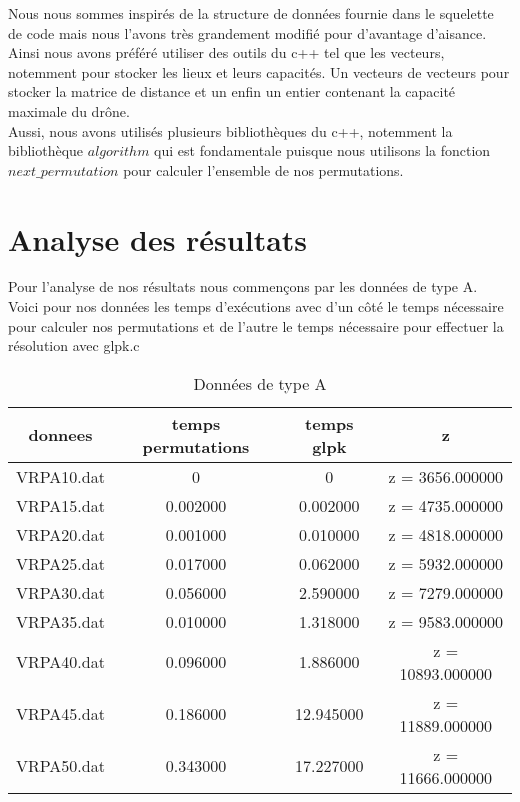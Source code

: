 \documentclass[a4paper,sffamily,12pt]{article}
\begin{document}
			\vspace{0.5cm}

				Nous nous sommes inspirés de la structure de données fournie dans le squelette de code mais nous l'avons très grandement modifié pour d'avantage d'aisance. Ainsi  nous avons préféré utiliser des outils du c++ tel que les vecteurs, notemment pour stocker les lieux et leurs capacités. Un vecteurs de vecteurs pour stocker la matrice de distance et un enfin un entier contenant la capacité maximale du drône. \\
				\indent Aussi, nous avons utilisés plusieurs bibliothèques du c++, notemment la bibliothèque $algorithm$ qui est fondamentale puisque nous utilisons la fonction $next\_permutation$ pour calculer l'ensemble de nos permutations.
		
		
	\section{Analyse des résultats}
	
		\vspace{0.5cm}		

		Pour l'analyse de nos résultats nous commençons par les données de type A. Voici pour nos données les temps d'exécutions avec d'un côté le temps nécessaire pour calculer nos permutations et de l'autre le temps nécessaire pour effectuer la résolution avec glpk.c\\


		\begin{table}[!h]
		
			\centering
		
			\begin{tabular}{ | c | c | c | c |}
			    	
			    	\hline
			  	donnees  & temps permutations & temps glpk  &  z   \\
			   	\hline
				VRPA10.dat	&	0			&	0		&		z = 3656.000000  \\
			 	\hline
				VRPA15.dat	&	0.002000		&	0.002000	&    		z = 4735.000000\\
			    	\hline
				VRPA20.dat	&	0.001000		&	0.010000	&		z = 4818.000000\\
			    	\hline
				VRPA25.dat	&	0.017000		&	0.062000	&		z = 5932.000000\\
			    	\hline
				VRPA30.dat	&	0.056000		&	2.590000	&		z = 7279.000000  \\
				\hline
				VRPA35.dat	&	0.010000		&	1.318000	&		z = 9583.000000 \\
			   	\hline
				VRPA40.dat	&	0.096000		&	1.886000	&		z = 10893.000000 \\
			   	\hline
			 	VRPA45.dat	&	0.186000		&	12.945000	&		z = 11889.000000  \\
				\hline
				VRPA50.dat	&	0.343000		&	17.227000	&		z = 11666.000000\\
			   	\hline
				
			\end{tabular}
				
			\caption{Données de type A}	
			
		\end{table}
\end{document}
